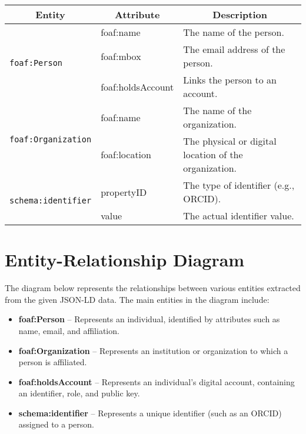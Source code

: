 \documentclass{article}
\begin{document}
\begin{longtable}{|l|l|p{8cm}|}
    \hline
    \multicolumn{1}{|c|}{\textbf{Entity}} & 
    \multicolumn{1}{c|}{\textbf{Attribute}} & 
    \multicolumn{1}{c|}{\textbf{Description}} \\
    \hline
    \multirow{3}{*}{\texttt{foaf:Person}}  
        & foaf:name & The name of the person. \\ \cline{2-3}
        & foaf:mbox & The email address of the person. \\ \cline{2-3}
        & foaf:holdsAccount & Links the person to an account. \\ 
    \hline
    \multirow{2}{*}{\texttt{foaf:Organization}}  
        & foaf:name & The name of the organization. \\ \cline{2-3}
        & foaf:location & The physical or digital location of the organization. \\ 
    \hline
    \multirow{2}{*}{\texttt{schema:identifier}}  
        & propertyID & The type of identifier (e.g., ORCID). \\ \cline{2-3}
        & value & The actual identifier value. \\ 
    \hline
    \end{longtable}


    \section{Entity-Relationship Diagram}

    The diagram below represents the relationships between various entities extracted from the given JSON-LD data. The main entities in the diagram include:
    
    \begin{itemize}
        \item \textbf{foaf:Person} – Represents an individual, identified by attributes such as name, email, and affiliation.
        \item \textbf{foaf:Organization} – Represents an institution or organization to which a person is affiliated.
        \item \textbf{foaf:holdsAccount} – Represents an individual's digital account, containing an identifier, role, and public key.
        \item \textbf{schema:identifier} – Represents a unique identifier (such as an ORCID) assigned to a person.
    \end{itemize}
    
    
    \vspace{1cm}
    
\end{document}
